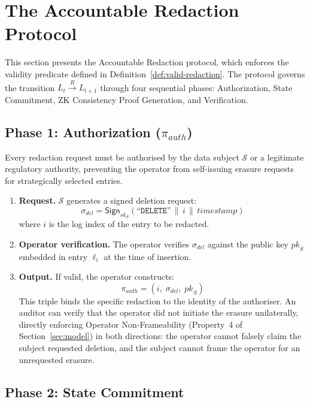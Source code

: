 \section{The Accountable Redaction Protocol}
\label{sec:protocol}

This section presents the Accountable Redaction protocol, which enforces
the validity predicate defined in Definition~\ref{def:valid-redaction}.
The protocol governs the transition $L_t \xrightarrow{R} L_{t+1}$ through
four sequential phases: Authorization, State Commitment, ZK Consistency
Proof Generation, and Verification.

\subsection{Phase 1: Authorization ($\pi_{\mathit{auth}}$)}
\label{subsec:auth}

Every redaction request must be authorised by the data subject $\mathcal{S}$
or a legitimate regulatory authority, preventing the operator from
self-issuing erasure requests for strategically selected entries.

\begin{enumerate}
  \item \textbf{Request.} $\mathcal{S}$ generates a signed deletion
  request:
  \[
    \sigma_{\mathit{del}} = \mathsf{Sign}_{\mathit{sk}_S}(
      \texttt{``DELETE''} \,\|\, i \,\|\, \mathit{timestamp}
    )
  \]
  where $i$ is the log index of the entry to be redacted.
  \item \textbf{Operator verification.} The operator verifies
  $\sigma_{\mathit{del}}$ against the public key $\mathit{pk}_S$
  embedded in entry $\ell_i$ at the time of insertion.
  \item \textbf{Output.} If valid, the operator constructs:
  \[
    \pi_{\mathit{auth}} = (i,\; \sigma_{\mathit{del}},\; \mathit{pk}_S)
  \]
  This triple binds the specific redaction to the identity of the
  authoriser. An auditor can verify that the operator did not initiate the
  erasure unilaterally, directly enforcing Operator Non-Frameability
  (Property~4 of Section~\ref{sec:model}) in both directions: the operator
  cannot falsely claim the subject requested deletion, and the subject
  cannot frame the operator for an unrequested erasure.
\end{enumerate}

\subsection{Phase 2: State Commitment}
\label{subsec:commit}

